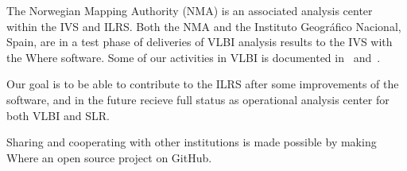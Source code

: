 
The Norwegian Mapping Authority (NMA) is an associated analysis center within
the IVS and ILRS. Both the NMA and the Instituto Geogr\'{a}fico Nacional,
Spain, are in a test phase of deliveries of VLBI analysis results to the IVS
with the Where software. Some of our activities in VLBI is documented
in~\cite{kirkvik2017b} and~\cite{kirkvik2018}. 

Our goal is to be able to contribute to the ILRS after some improvements of the
software, and in the future recieve full status as operational analysis center
for both VLBI and SLR. 

Sharing and cooperating with other institutions is made possible by making
Where an open source project on GitHub.

\endinput
